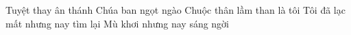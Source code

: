 Tuyệt thay ân thánh Chúa ban ngọt ngào
Chuộc thân lầm than là tôi
Tôi đã lạc mất nhưng nay tìm lại
Mù khơi nhưng nay sáng ngời 
